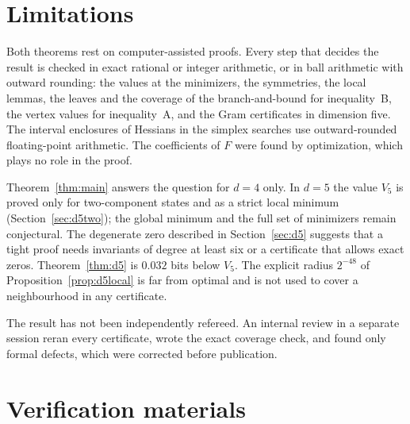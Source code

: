 \documentclass[11pt,a4paper]{article}
\theoremstyle{plain}
\begin{document}
\section{Limitations}

Both theorems rest on computer-assisted proofs. Every step that decides the
result is checked in exact rational or integer arithmetic, or in ball
arithmetic with outward rounding: the values at the minimizers, the
symmetries, the local lemmas, the leaves and the coverage of the
branch-and-bound for inequality~B, the vertex values for inequality~A, and the
Gram certificates in dimension five. The interval enclosures of Hessians in
the simplex searches use outward-rounded floating-point arithmetic. The
coefficients of $F$ were found by optimization, which plays no role in the
proof.

Theorem~\ref{thm:main} answers the question for $d=4$ only. In $d=5$ the value
$V_5$ is proved only for two-component states and as a strict local minimum
(Section~\ref{sec:d5two}); the global minimum and the full set of minimizers
remain conjectural. The degenerate zero described in Section~\ref{sec:d5}
suggests that a tight proof needs invariants of degree at least six or a
certificate that allows exact zeros. Theorem~\ref{thm:d5} is $0.032$ bits
below $V_5$. The explicit radius $2^{-48}$ of
Proposition~\ref{prop:d5local} is far from optimal and is not used to cover a
neighbourhood in any certificate.

The result has not been independently refereed. An internal review in a
separate session reran every certificate, wrote the exact coverage check, and
found only formal defects, which were corrected before publication.

\section{Verification materials}\label{sec:verif}
\end{document}
